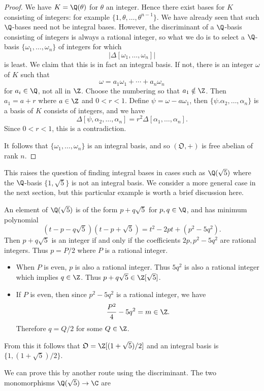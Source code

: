 \begin{proof}
We have $K=\Q(\theta)$ for $\theta$ an integer. Hence there exist bases for $K$ consisting of integers: for example $\{1,\theta,\dots,\theta^{n-1}\}$. We have already seen that such $\Q$-bases need not be integral bases. However, the discriminant of a $\Q$-basis consisting of integers is always a rational integer, so what we do is to select a $\Q$-basis $\{\omega_1,\dots,\omega_n\}$ of integers for which 
\[|\Delta[\omega_1,\dots,\omega_n]|\]
is least. We claim that this is in fact an integral basis. If not, there is an
integer $\omega$ of $K$ such that 
\[\omega=a_1\omega_1+\cdots+a_n\omega_n\]
for $a_i\in\Q$, not all in $\Z$. Choose the numbering so that $a_1\notin\Z$. Then $a_1=a+r$ where $a\in\Z$ and $0<r<1$. Define $\psi=\omega-a\omega_1$, then $\{\psi.\alpha_2,\dots,\alpha_n\}$ is a basis of $K$ consists of integers, and we have
\[\Delta[\psi,\alpha_2,\dots,\alpha_n]=r^2\Delta[\alpha_1,\dots,\alpha_n].\]
Since $0<r<1$, this is a contradiction.\par
It follows that $\{\omega_1,\dots,\omega_n\}$ is an integral basis, and so $(\mathfrak{O},+)$ is free abelian of rank $n$.
\end{proof}
This raises the question of finding integral bases in cases such as $\Q(\sqrt{5})$ where the $\Q$-basis $\{1,\sqrt{5}\}$ is not an integral basis. We consider a more general case in the next section, but this particular example is worth a brief discussion here.
\begin{example}
An element of $\Q(\sqrt{5})$ is of the form $p+q\sqrt{5}$ for $p,q\in\Q$, and has minimum polynomial
\[(t-p-q\sqrt{5})(t-p+\sqrt{5})=t^2-2pt+(p^2-5q^2).\]
Then $p+q\sqrt{5}$ is an integer if and only if the coefficients $2p,p^2-5q^2$ are rational integers. Thus $p=P/2$ where $P$ is a rational integer.
\begin{itemize}
\item When $P$ is even, $p$ is also a rational integer. Thus $5q^2$ is also a rational integer which implies $q\in\Z$. Thus $p+q\sqrt{5}\in\Z[\sqrt{5}]$.
\item If $P$ is even, then since $p^2-5q^2$ is a rational integer, we have
\[\frac{P^2}{4}-5q^2=m\in\Z.\]
Therefore $q=Q/2$ for some $Q\in\Z$. 
\end{itemize}
From this it follows that $\mathfrak{O}=\Z[(1+\sqrt{5})/2]$ and an integral basis is $\{1,(1+\sqrt{5})/2\}$.\end{example}
We can prove this by another route using the discriminant. The two monomorphisms $\Q(\sqrt{5})\to\C$ are
